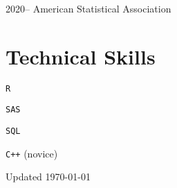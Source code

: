 \documentclass[12pt,letterpaper]{report}
\newcommand{\listitemspace}{0.15em}
\renewenvironment{itemize}
{\begin{list}{}{\setlength{\leftmargin}{0em}
            \setlength{\parskip}{0em}
            \setlength{\itemsep}{\listitemspace}
            \setlength{\parsep}{\listitemspace}}}
    {\end{list}}
\begin{document}
    \begin{tablist}

        \item[2020--] \tab American Statistical Association

    \end{tablist}

    \section*{Technical Skills}

    \begin{itemize}

        \item \texttt{R}
        
        \item \texttt{SAS}
        
        \item \texttt{SQL}
        
        \item \texttt{C++} (novice)

    \end{itemize}

    \begin{center}
        \vfill
        Updated \monthyeardate\today
    \end{center}
\end{document}
